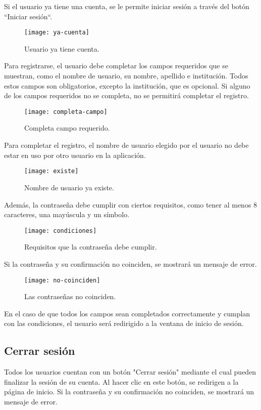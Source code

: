 Si el usuario ya tiene una cuenta, se le permite iniciar sesión a través del botón ``Iniciar sesión``.

\begin{figure}[htb]
\centering
\texttt{[image: ya-cuenta]}
\caption{Usuario ya tiene cuenta.}
\label{fig:ya-cuenta}
\end{figure}

Para registrarse, el usuario debe completar los campos requeridos que se muestran, como el nombre de usuario, su nombre, apellido e institución. Todos estos campos son obligatorios, excepto la institución, que es opcional. Si alguno de los campos requeridos no se completa, no se permitirá completar el registro.
\newpage
\begin{figure}[htb]
\centering
\texttt{[image: completa-campo]}
\caption{Completa campo requerido.}
\label{fig:completa-campo}
\end{figure}

Para completar el registro, el nombre de usuario elegido por el usuario no debe estar en uso por otro usuario en la aplicación.

\begin{figure}[htb]
\centering
\texttt{[image: existe]}
\caption{Nombre de usuario ya existe.}
\label{fig:existe}
\end{figure}

Además, la contraseña debe cumplir con ciertos requisitos, como tener al menos 8 caracteres, una mayúscula y un símbolo.
\newpage
\begin{figure}[htb]
\centering
\texttt{[image: condiciones]}
\caption{Requisitos que la contraseña debe cumplir.}
\label{fig:condiciones}
\end{figure}

Si la contraseña y su confirmación no coinciden, se mostrará un mensaje de error.
\begin{figure}[htb]
\centering
\texttt{[image: no-coinciden]}
\caption{Las contraseñas no coinciden.}
\label{fig:no-coinciden}
\end{figure}

En el caso de que todos los campos sean completados correctamente y cumplan con las condiciones, el usuario será redirigido a la ventana de inicio de sesión.

\subsection{Cerrar sesión}
Todos los usuarios cuentan con un botón "Cerrar sesión" mediante el cual pueden finalizar la sesión de su cuenta. Al hacer clic en este botón, se redirigen a la página de inicio.
Si la contraseña y su confirmación no coinciden, se mostrará un mensaje de error.

